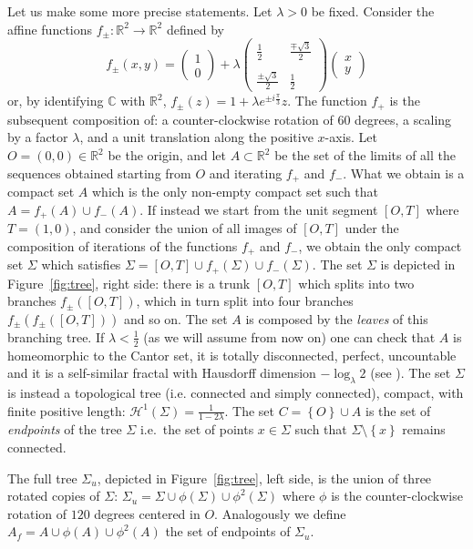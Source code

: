 \documentclass{amsart}
\newcommand{\RR}{\mathbb R}
\newcommand{\CC}{\mathbb C}
\renewcommand{\H}{\mathcal H}
\newcommand{\ENCLOSE}[1]{\left\{#1\right\}}
\renewcommand{\H}{\mathcal{H}}
\theoremstyle{definition}
\theoremstyle{remark}
\begin{document}
Let us make some more precise statements.
Let $\lambda>0$ be fixed.
Consider the affine functions $f_\pm\colon \RR^2\to \RR^2$ defined by
\[
  f_\pm(x,y) = \begin{pmatrix} 1 \\ 0 \end{pmatrix} 
    + \lambda \begin{pmatrix} 
        \frac 1 2 & \frac{\mp\sqrt 3}{2} \\\\ 
        \frac{\pm\sqrt 3}{2} & \frac 1 2 
      \end{pmatrix} \begin{pmatrix} x \\ y \end{pmatrix}
\]
or, by identifying $\CC$ with $\RR^2$,
$f_\pm(z) = 1 + \lambda e^{\pm i \frac \pi 3} z$.
The function $f_+$ is the subsequent composition of: a counter-clockwise rotation of $60$ degrees,
a scaling by a factor $\lambda$, and a unit translation along the positive $x$-axis.
Let $O=(0,0)\in \RR^2$ be the origin, and let $A\subset \RR^2$ be the set of 
the limits of all the sequences obtained starting from $O$ and 
iterating $f_+$ and $f_-$.
What we obtain is a compact set $A$ which is the only non-empty compact set 
such that $A=f_+(A)\cup f_-(A)$.
If instead we start from the unit segment $[O,T]$ where $T=(1,0)$, and 
consider the union of all images of $[O,T]$ under the composition of iterations of the 
functions $f_+$ and $f_-$, we obtain the only compact set $\Sigma$ which satisfies 
$\Sigma=[O,T]\cup f_+(\Sigma)\cup f_-(\Sigma)$.
The set $\Sigma$ is depicted in Figure~\ref{fig:tree}, right side:
there is a trunk $[O,T]$ which splits into two branches $f_\pm([O,T])$, 
which in turn split into four branches $f_\pm(f_\pm([O,T]))$ and so on.
The set $A$ is composed by the \emph{leaves} of this branching tree.
If $\lambda < \frac 1 2$ (as we will assume from now on)
one can check that $A$ is 
homeomorphic to the Cantor set, it is totally disconnected, 
perfect, uncountable and it is a self-similar fractal with Hausdorff dimension
$-\log_\lambda 2$ (see \cite{Hut81}).
The set $\Sigma$ is instead a topological tree (i.e.{} connected and simply connected), 
compact, with finite positive length: $\H^1(\Sigma) = \frac{1}{1-2\lambda}$.
The set $C=\ENCLOSE{O}\cup A$ is the set of \emph{endpoints} of the tree $\Sigma$ i.e.\ 
the set of points $x\in \Sigma$ such that $\Sigma\setminus\ENCLOSE{x}$ remains connected.

The full tree $\Sigma_u$, depicted in Figure~\ref{fig:tree}, left side,
is the union of three rotated copies of $\Sigma$: $\Sigma_u = \Sigma \cup \phi(\Sigma) \cup \phi^2(\Sigma)$
where $\phi$ is the counter-clockwise rotation of $120$ degrees centered in $O$.
Analogously we define $A_f = A \cup \phi(A) \cup \phi^2(A)$ the set of endpoints of $\Sigma_u$.
\end{document}
